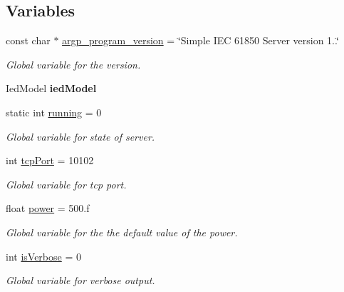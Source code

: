 \subsection*{Variables}
\begin{DoxyCompactItemize}
\item 
const char $\ast$ \hyperlink{simple-iec61850-server_8c_a62f73ea01c816f1996aed4c66f57c4fb}{argp\+\_\+program\+\_\+version} = \char`\"{}Simple I\+EC 61850 Server version 1..\char`\"{}
\begin{DoxyCompactList}\small\item\em Global variable for the version. \end{DoxyCompactList}\item 
Ied\+Model {\bfseries ied\+Model}\hypertarget{simple-iec61850-server_8c_a12458534e574afa1fd44b76a5b691719}{}\label{simple-iec61850-server_8c_a12458534e574afa1fd44b76a5b691719}

\item 
static int \hyperlink{simple-iec61850-server_8c_a2f45113638a0b749a8a205d2cd7fb42b}{running} = 0\hypertarget{simple-iec61850-server_8c_a2f45113638a0b749a8a205d2cd7fb42b}{}\label{simple-iec61850-server_8c_a2f45113638a0b749a8a205d2cd7fb42b}

\begin{DoxyCompactList}\small\item\em Global variable for state of server. \end{DoxyCompactList}\item 
int \hyperlink{simple-iec61850-server_8c_ac31354d08316076b496efb2b3a2c69e6}{tcp\+Port} = 10102\hypertarget{simple-iec61850-server_8c_ac31354d08316076b496efb2b3a2c69e6}{}\label{simple-iec61850-server_8c_ac31354d08316076b496efb2b3a2c69e6}

\begin{DoxyCompactList}\small\item\em Global variable for tcp port. \end{DoxyCompactList}\item 
float \hyperlink{simple-iec61850-server_8c_af2eae6b68aca1a3174f57157c50f58f1}{power} = 500.f\hypertarget{simple-iec61850-server_8c_af2eae6b68aca1a3174f57157c50f58f1}{}\label{simple-iec61850-server_8c_af2eae6b68aca1a3174f57157c50f58f1}

\begin{DoxyCompactList}\small\item\em Global variable for the the default value of the power. \end{DoxyCompactList}\item 
int \hyperlink{simple-iec61850-server_8c_af40caf0f193ce7061522488c9df48f02}{is\+Verbose} = 0\hypertarget{simple-iec61850-server_8c_af40caf0f193ce7061522488c9df48f02}{}\label{simple-iec61850-server_8c_af40caf0f193ce7061522488c9df48f02}

\begin{DoxyCompactList}\small\item\em Global variable for verbose output. \end{DoxyCompactList}\end{DoxyCompactItemize}


